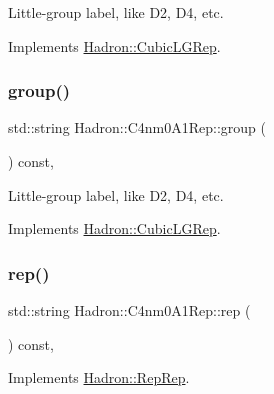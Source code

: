 Little-\/group label, like D2, D4, etc. 

Implements \mbox{\hyperlink{structHadron_1_1CubicLGRep_a9bdb14b519a611d21379ed96a3a9eb41}{Hadron\+::\+Cubic\+L\+G\+Rep}}.

\mbox{\label{structHadron_1_1C4nm0A1Rep_a8a1fbd6d906d95cd3fa74bac06176aaa}} 
\subsubsection{\texorpdfstring{group()}{group()}\hspace{0.1cm}{\footnotesize\ttfamily [3/3]}}
{\footnotesize\ttfamily std\+::string Hadron\+::\+C4nm0\+A1\+Rep\+::group (\begin{DoxyParamCaption}{ }\end{DoxyParamCaption}) const\hspace{0.3cm}{\ttfamily [inline]}, {\ttfamily [virtual]}}

Little-\/group label, like D2, D4, etc. 

Implements \mbox{\hyperlink{structHadron_1_1CubicLGRep_a9bdb14b519a611d21379ed96a3a9eb41}{Hadron\+::\+Cubic\+L\+G\+Rep}}.

\mbox{\label{structHadron_1_1C4nm0A1Rep_a5abe060187192307a0f68c3ac73704bc}} 
\subsubsection{\texorpdfstring{rep()}{rep()}\hspace{0.1cm}{\footnotesize\ttfamily [1/3]}}
{\footnotesize\ttfamily std\+::string Hadron\+::\+C4nm0\+A1\+Rep\+::rep (\begin{DoxyParamCaption}{ }\end{DoxyParamCaption}) const\hspace{0.3cm}{\ttfamily [inline]}, {\ttfamily [virtual]}}



Implements \mbox{\hyperlink{structHadron_1_1RepRep_ab3213025f6de249f7095892109575fde}{Hadron\+::\+Rep\+Rep}}.

\mbox{\label{structHadron_1_1C4nm0A1Rep_a5abe060187192307a0f68c3ac73704bc}} 
